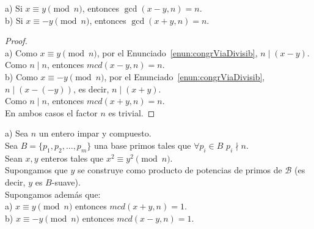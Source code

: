 \begin{enunciado}\label{enun:congrEsteril}\leavevmode\par
a) Si $x \equiv y \pmod n$, entonces $\gcd(x-y, n) = n$. \\
b) Si $x \equiv -y \pmod n$, entonces $\gcd(x+y, n) = n$.
\end{enunciado}

\begin{proof} \, \\
a) Como $x \equiv y \pmod n$, por el Enunciado~\ref{enun:congrViaDivisib}, $n \mid (x-y)$. \\
Como $n \mid n$, entonces $mcd(x-y, n) = n$. \\
b) Como $x \equiv -y \pmod n$, por el Enunciado~\ref{enun:congrViaDivisib}, $n \mid (x-(-y))$, es decir, $n \mid (x+y)$. \\
Como $n \mid n$, entonces $mcd(x+y,n) = n$. \\
En ambos casos el factor $n$ es trivial.
\end{proof}

\begin{enunciado}\label{enun:congrEsteril2}\leavevmode\par
a) Sea $n$ un entero impar y compuesto. 
\\ Sea $B=\{p_{1},p_{2},\dots ,p_{m}\}$ una base primos tales que $\forall p_{i} \in B \,\, p_{i} \nmid n$. \\
Sean $x,y$ enteros tales que $x^{2} \equiv y^{2}\pmod n$. \\
Supongamos que $y$ se construye como producto de potencias de primos de $\mathcal{B}$ (es decir, $y$ es $B$-suave). \\
Supongamos además que: \\
a) $x \equiv y \pmod n$ entonces $mcd(x+y,n)=1$. \\
b) $x \equiv -y \pmod n$ entonces $mcd(x-y,n)=1$.
\end{enunciado}

